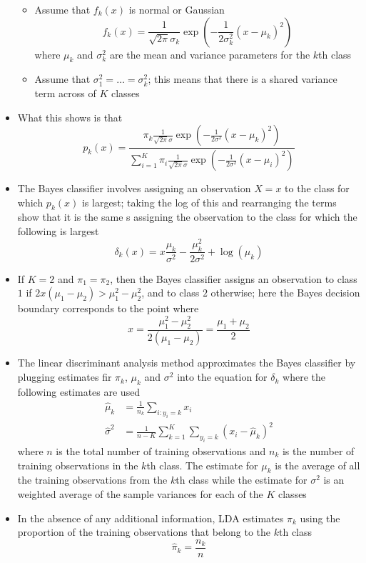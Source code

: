 \documentclass[12pt]{article}
\begin{document}
\begin{itemize}
\begin{itemize}
\item Assume that $f_k(x)$ is normal or Gaussian $$ f_k(x) = \frac{1}{\sqrt{2\pi} \sigma_k}\exp\left( -\frac{1}{2\sigma^2_k} (x-\mu_k)^2\right) $$ where $\mu_k$ and $\sigma^2_k$ are the mean and variance parameters for the $k$th class 
\item Assume that $\sigma_1^2 = \dots = \sigma_k^2$; this means that there is a shared variance term across of $K$ classes \end{itemize} 
\item What this shows is that $$ p_k(x) = \frac{\pi_k \frac{1}{\sqrt{2\pi}\sigma} \exp\left( -\frac{1}{2\sigma^2} (x-\mu_k)^2\right)}{\sum_{i=1}^K \pi_i \frac{1}{\sqrt{2\pi}\sigma} \exp\left( -\frac{1}{2\sigma^2} (x-\mu_i)^2\right)} $$ 
\item The Bayes classifier involves assigning an observation $X=x$ to the class for which $p_k(x)$ is largest; taking the log of this and rearranging the terms show that it is the same s assigning the observation to the class for which the following is largest $$ \delta_k(x) = x\frac{\mu_k}{\sigma^2} - \frac{\mu_k^2}{2\sigma^2} + \log(\mu_k) $$ 
\item If $K=2$ and $\pi_1 = \pi_2$, then the Bayes classifier assigns an observation to class $1$ if $2x(\mu_1 - \mu_2) > \mu_1^2 - \mu_2^2$, and to class $2$ otherwise; here the Bayes decision boundary corresponds to the point where $$ x = \frac{\mu_1^2 - \mu_2^2}{2(\mu_1 - \mu_2)} = \frac{\mu_1 + \mu_2}{2} $$ 
\item The linear discriminant analysis method approximates the Bayes classifier by plugging estimates fir $\pi_k$, $\mu_k$ and $\sigma^2$ into the equation for $\delta_k$ where the following estimates are used $$ \begin{aligned} \hat{\mu}_k &= \frac{1}{n_k}\sum_{i: y_i = k} x_i \\ \hat{\sigma}^2 &= \frac{1}{n-K}\sum_{k=1}^K \sum_{y_i = k} (x_i - \hat{\mu}_k)^2 \end{aligned} $$ where $n$ is the total number of training observations and $n_k$ is the number of training observations in the $k$th class. The estimate for $\mu_k$ is the average of all the training observations from the $k$th class while the estimate for $\sigma^2$ is an weighted average of the sample variances for each of the $K$ classes
\item In the absence of any additional information, LDA estimates $\pi_k$ using the proportion of the training observations that belong to the $k$th class $$ \hat{\pi}_k = \frac{n_k}{n} $$ 

\end{itemize}
\end{document}

